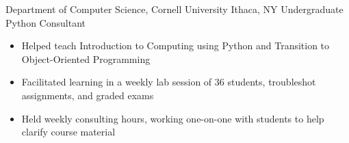 
        {Department of Computer Science, Cornell University}
        {Ithaca, NY}
        {Undergraduate Python Consultant}
        {}{
    \begin{itemize}
        \item Helped teach Introduction to Computing using Python and Transition to Object-Oriented Programming
        \item Facilitated learning in a weekly lab session of 36 students, troubleshot assignments, and graded exams
        \item Held weekly consulting hours, working one-on-one with students to help clarify course material
    \end{itemize}
}
